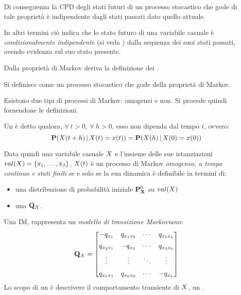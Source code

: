 Di conseguenza la \acl{CPD} degli stati futuri di un processo stocastico che gode di tale proprietà è indipendente dagli stati passati dato quello attuale.

In altri termini ciò indica che lo stato futuro di una variabile casuale è \emph{condizionalmente indipendente} (si veda ) dalla sequenza dei suoi stati passati, avendo evidenza sul suo stato presente.

Dalla proprietà di Markov deriva la definizione dei \mprocess{}.

\begin{definizione}[\upcase\mprocess*{}]
Si definisce come \mprocess*{} un processo stocastico che gode della proprietà di Markov.
\end{definizione}

Esistono due tipi di processi di Markov: omogenei e non. Si procede quindi fornendone le definizioni.

\begin{definizione}[\upcase\mprocess*{} \omog*{}]
\label{defn:homogeneus-markov-process}
Un \mprocess*{} è detto \emph{\omog*{}} qualora, $\forall\:t>0$, $\forall\:h>0$, esso non dipenda dal tempo $t$, ovvero:
\begin{equation}
\label{eq:homogeneus-markov-process}
\mathbf{P}(\mathnormal{X}(t + h)\,\arrowvert\,\mathnormal{X}(t)=x(t))=\mathbf{P}(\mathnormal{X}(h)\,\arrowvert\,\mathnormal{X}(0)=x(0))
\end{equation}
\end{definizione}
Data quindi una variabile casuale $\mathnormal{X}$ e l'insieme delle sue istanziazioni $val(\mathnormal{X})=\{ \mathrm{x_1}, \dotsc, \mathrm{x_J} \}$, $\mathnormal{X}(t)$ è un processo di Markov \emph{omogeneo, a tempo continuo e stati finiti} se e solo se la sua dinamica è definibile in termini di:
\begin{itemize}
    \item una distribuzione di probabilità iniziale $\mathbf{P}^0_{\mathbf{X}}$ su $val(\mathnormal{X})$
    \item una \im*{} $\mathbf{Q}_{\mathnormal{X}}$.
\end{itemize}

\begin{definizione}[\upcase\im*{}]
\label{defn:im}
Una \acf{IM}, rappresenta un \emph{modello di transizione Markoviano}:
\[
\mathbf{Q}_{\mathnormal{X}}= \begin{bmatrix}
                        -q_{x_1}    & q_{x_1x_2}& \cdots & q_{x_1x_k}   \\[0.5em]
                        q_{x_2x_1}  & -q_{x_2}  & \cdots & q_{x_2x_k}   \\[0.5em]
                        \vdots      & \vdots    & \ddots & \vdots       \\[0.5em]
                        q_{x_kx_1}  & q_{x_kx_2}& \cdots & -q_{x_k}
                    \end{bmatrix}
\]
Lo scopo di un \im*{} è descrivere il comportamento transiente di $\mathnormal{X}$, un \mprocess*{} \omog*{}.
\end{definizione}

